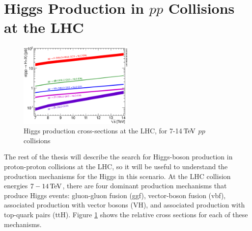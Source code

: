 \section{Higgs Production in $pp$ Collisions at the LHC}
\label{higgs_production_overview}

\begin{figure}[h]
   \centering
  \includegraphics[width=0.5\textwidth]{Figures/Experimental_Results/Higgs_XS_7-14TeV.eps}
  \caption{Higgs production cross-sections at the LHC, for 7-14$\,\text{Te\hspace{-.08em}V}$
    $pp$ collisions} \label{fig:Higgs_XS_7-14TeV}
\end{figure}

\par The rest of the thesis will describe the search for Higgs-boson
production in proton-proton collisions at the LHC, so it will be
useful to understand the production mechanisms for the Higgs in this
scenario.  At the LHC collision energies $7-14\,\text{Te\hspace{-.08em}V}$, there are four
dominant production mechanisms that produce Higgs events: gluon-gluon
fusion (ggf), vector-boson fusion (vbf), associated production with vector bosons (VH), and associated production with top-quark pairs (ttH).  Figure
\ref{fig:Higgs_XS_7-14TeV} shows the relative cross sections for each
of these mechanisms.  

